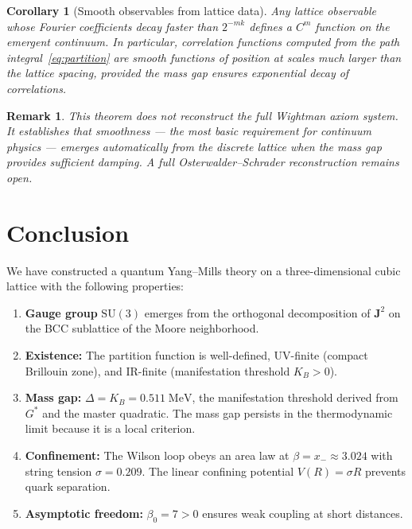 \documentclass[11pt]{article}
\theoremstyle{tight}
\newtheorem{corollary}[theorem]{Corollary}
\theoremstyle{plainroman}
\newtheorem{remark}[theorem]{Remark}
\begin{document}
\begin{corollary}[Smooth observables from lattice data]
Any lattice observable whose Fourier coefficients decay faster than $2^{-mk}$ defines a $C^m$ function on the emergent continuum.
In particular, correlation functions computed from the path integral~\eqref{eq:partition} are smooth functions of position at scales much larger than the lattice spacing, provided the mass gap ensures exponential decay of correlations.
\end{corollary}

\begin{remark}
This theorem does not reconstruct the full Wightman axiom system.
It establishes that \emph{smoothness} --- the most basic requirement for continuum physics --- emerges automatically from the discrete lattice when the mass gap provides sufficient damping.
A full Osterwalder--Schrader reconstruction remains open.
\end{remark}

\section{Conclusion}

We have constructed a quantum Yang--Mills theory on a three-dimensional cubic lattice with the following properties:

\begin{enumerate}[nosep]
\item \textbf{Gauge group} $\mathrm{SU}(3)$ emerges from the orthogonal decomposition of $\mathbf J^2$ on the BCC sublattice of the Moore neighborhood.
\item \textbf{Existence:} The partition function is well-defined, UV-finite (compact Brillouin zone), and IR-finite (manifestation threshold $K_B>0$).
\item \textbf{Mass gap:} $\Delta=K_B=0.511\;\text{MeV}$, the manifestation threshold derived from $G^*$ and the master quadratic.
The mass gap persists in the thermodynamic limit because it is a local criterion.
\item \textbf{Confinement:} The Wilson loop obeys an area law at $\beta=x_-\approx 3.024$ with string tension $\sigma=0.209$.
The linear confining potential $V(R)=\sigma R$ prevents quark separation.
\item \textbf{Asymptotic freedom:} $\beta_0=7>0$ ensures weak coupling at short distances.
\end{enumerate}
\end{document}
